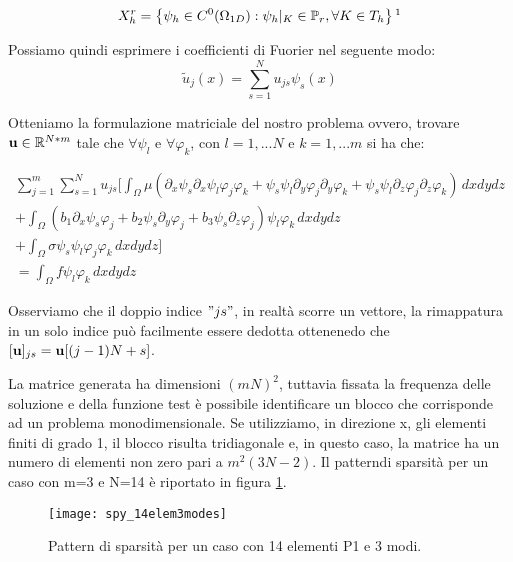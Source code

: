 \begin{equation}
\label{eq: spazio polinomiale}
X_h^r= \left\{\psi_h \in C^0(\Omega_{1D}): \psi_h \vert_K  \in \mathbb{P}_r,\forall K\in T_h \right\}\footnotemark
\end{equation}


Possiamo quindi esprimere i coefficienti di Fuorier nel seguente modo: 
\begin{equation}
\label{eq: coeff fourier espansi}
\tilde{u}_j(x)=\sum_{s=1}^Nu_{js}\psi_s(x)
\end{equation}

 
 Otteniamo la formulazione matriciale del nostro problema ovvero, trovare $\mathbf{u} \in \mathbb{R}^{N*m}$ tale che $\forall \psi_l$ e $\forall \varphi_k$, con $l=1,...N$ e $k=1,...m$ si ha che:

\begin{multline}
\sum_{j=1}^m \sum_{s=1}^N
u_{js} \Bigg[ \int_\Omega\mu( \partial_x\psi_s \partial_x\psi_l\varphi _j\varphi _k + \psi_s \psi_l \partial_y\varphi _j\partial_y\varphi _k + \psi_s \psi_l \partial_z\varphi _j\partial_z\varphi _k)\,dxdydz \\
+ \int_\Omega (b_1\partial_x\psi_s\varphi _j+b_2\psi_s\partial_y\varphi _j + b_3\psi_s\partial_z\varphi_j)\psi_l\varphi _k\,dxdydz\\ 
+\int_\Omega \sigma\psi_s\psi_l\varphi _j\varphi _k\,dxdydz \Bigg]\\
=\int_\Omega f\psi_l\varphi _k\,dxdydz
\end{multline}

 Osserviamo che il doppio indice $"js"$, in realt\`a scorre un vettore, la rimappatura in un solo indice pu\`o 
 facilmente essere dedotta ottenenedo che $[\mathbf{u}]_{js}=\mathbf{u}[(j-1)N+s]$. 
 
 La matrice generata ha dimensioni $(mN)^2$, tuttavia fissata la frequenza delle soluzione e della funzione test \`e 
 possibile identificare un blocco che corrisponde ad un problema monodimensionale.
 Se utilizziamo, in direzione x, gli elementi finiti di grado 1, il blocco risulta tridiagonale e, in questo caso, la matrice ha un numero di elementi non zero pari a $m^2(3N-2)$. Il pattern\footnotemark di sparsit\`a per un caso con m=3 e N=14 \`e riportato in figura \ref{fig:pattern}.
 
 \begin{figure}[h]
    \centering
    \texttt{[image: spy\_14elem3modes]}
    \caption{Pattern di sparsit\`a per un caso con 14 elementi P1 e 3 modi.}
    \label{fig:pattern}
\end{figure}

